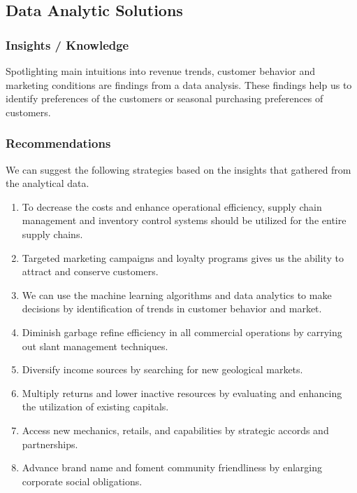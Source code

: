 \documentclass[12pt,a4Paper]{article}
\begin{document}
\subsection{Data Analytic Solutions}
\subsubsection{Insights / Knowledge}
Spotlighting main intuitions into revenue trends, customer behavior and marketing conditions are findings from a data analysis. These findings help us to identify preferences of the customers or seasonal purchasing preferences of customers.
\subsubsection{Recommendations}
We can suggest the following strategies based on the insights that gathered from the analytical data.
\begin{enumerate}
\item To decrease the costs and enhance operational efficiency, supply chain management and inventory control systems should be utilized for the entire supply chains. 
\item Targeted marketing campaigns and loyalty programs gives us the ability to attract and conserve customers.
\item We can use the machine learning algorithms and data analytics to make decisions by identification of trends in customer behavior and market.
\item Diminish garbage refine efficiency in all commercial operations by carrying out slant management techniques.
\item Diversify income sources by searching for new geological markets.
\item Multiply returns and lower inactive resources by evaluating and enhancing the utilization of existing capitals.
\item Access new mechanics, retails, and capabilities by strategic accords and partnerships.
\item Advance brand name and foment community friendliness by enlarging corporate social obligations.
\end{enumerate}
\end{document}
